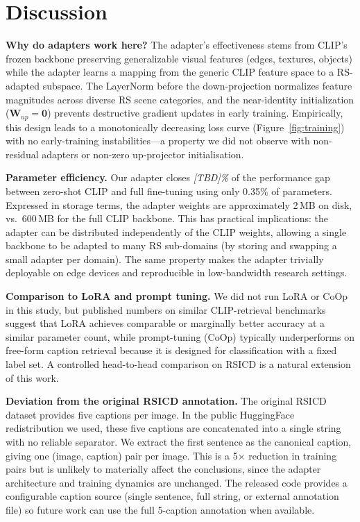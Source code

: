 \documentclass[review,12pt]{elsarticle}
\begin{document}
\section{Discussion}
\label{sec:discussion}

\textbf{Why do adapters work here?}
The adapter's effectiveness stems from CLIP's frozen backbone preserving
generalizable visual features (edges, textures, objects) while the adapter
learns a mapping from the generic CLIP feature space to a RS-adapted
subspace. The LayerNorm before the down-projection normalizes feature
magnitudes across diverse RS scene categories, and the near-identity
initialization ($\mathbf{W}_{up}=\mathbf{0}$) prevents destructive
gradient updates in early training. Empirically, this design leads to a
monotonically decreasing loss curve (Figure~\ref{fig:training}) with
no early-training instabilities---a property we did not observe with
non-residual adapters or non-zero up-projector initialisation.

\textbf{Parameter efficiency.}
Our adapter closes \textit{[TBD]\%} of the performance gap between
zero-shot CLIP and full fine-tuning using only 0.35\% of parameters.
Expressed in storage terms, the adapter weights are approximately 2\,MB
on disk, vs.\ 600\,MB for the full CLIP backbone. This has practical
implications: the adapter can be distributed independently of the CLIP
weights, allowing a single backbone to be adapted to many RS sub-domains
(by storing and swapping a small adapter per domain). The same property
makes the adapter trivially deployable on edge devices and reproducible
in low-bandwidth research settings.

\textbf{Comparison to LoRA and prompt tuning.}
We did not run LoRA or CoOp in this study, but published numbers on
similar CLIP-retrieval benchmarks suggest that LoRA achieves comparable
or marginally better accuracy at a similar parameter count, while
prompt-tuning (CoOp) typically underperforms on free-form caption
retrieval because it is designed for classification with a fixed
label set. A controlled head-to-head comparison on RSICD is a natural
extension of this work.

\textbf{Deviation from the original RSICD annotation.}
The original RSICD dataset provides five captions per image. In the public
HuggingFace redistribution we used, these five captions are concatenated
into a single string with no reliable separator. We extract the first
sentence as the canonical caption, giving one (image, caption) pair per
image. This is a 5$\times$ reduction in training pairs but is unlikely to
materially affect the conclusions, since the adapter architecture and
training dynamics are unchanged. The released code provides a configurable
caption source (single sentence, full string, or external annotation
file) so future work can use the full 5-caption annotation when
available.
\end{document}
